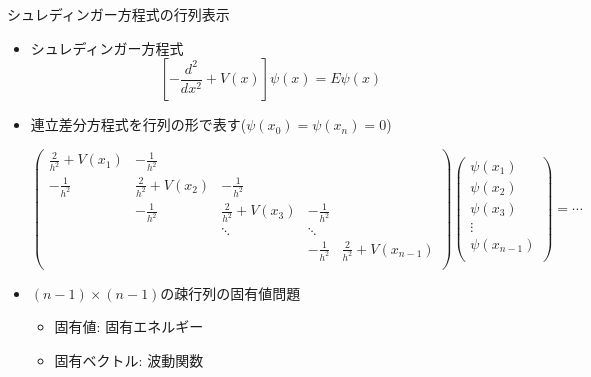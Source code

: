 \begin{frame}[t,fragile]{シュレディンガー方程式の行列表示}
  \begin{itemize}
  \item シュレディンガー方程式
    \[
    [-\frac{d^2}{dx^2}+V(x)]\psi(x) = E \psi(x)
    \]
  \item 連立差分方程式を行列の形で表す($\psi(x_0)=\psi(x_n)=0$)
    \begin{footnotesize}
    \[
    \begin{pmatrix}
      \frac{2}{h^2}+V(x_1) & -\frac{1}{h^2} \\
      -\frac{1}{h^2} & \frac{2}{h^2}+V(x_2) & -\frac{1}{h^2} \\
      & -\frac{1}{h^2} & \frac{2}{h^2}+V(x_3) & -\frac{1}{h^2} \\
      & & \ddots & \ddots \\
      & & & -\frac{1}{h^2} & \frac{2}{h^2}+V(x_{n-1}) \\
    \end{pmatrix}
    \begin{pmatrix}
      \psi(x_1) \\
      \psi(x_2) \\
      \psi(x_3) \\
      \vdots \\
      \psi(x_{n-1}) \\
    \end{pmatrix}
    = \cdots %
    \]
    \end{footnotesize}
  \item $(n-1) \times (n-1)$の疎行列の固有値問題
    \begin{itemize}
    \item 固有値: 固有エネルギー
    \item 固有ベクトル: 波動関数
    \end{itemize}
  \end{itemize}
\end{frame}
